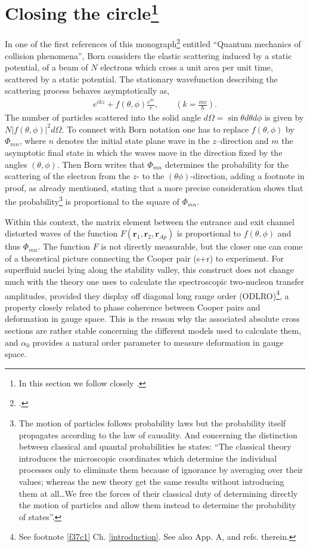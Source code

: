\section[Closing the circle]{Closing the circle\footnote{In this section we follow closely \cite{Pais:86}.}}\label{S7.6.4}
In one of the first references of this monograph\footnote{\cite{Born:26}.} entitled ``Quantum mechanics of collision phenomena'', Born considers the elastic scattering induced by a static potential, of a beam of $N$ electrons which cross a unit area per unit time, scattered by a static potential. The stationary wavefunction describing the scattering process behaves asymptotically as,
\begin{align}\label{eq7.4.2}
e^{ikz}+f(\theta,\phi)\frac{e^{kr}}{r},\quad\quad \left(k=\frac{mv}{\hbar}\right).
\end{align}
The number of particles scattered into the solid angle $d\Omega=\sin\theta d\theta d\phi$ is given by $N|f(\theta,\phi)|^2d\Omega$. To connect with Born notation one has to replace $f(\theta,\phi)$ by $\Phi_{mn}$, where $n$ denotes the initial state plane wave in the $z$--direction and $m$ the asymptotic final state in which the waves move in the direction fixed by the angles $(\theta,\phi)$. Then Born writes that $\Phi_{mn}$ determines the probability for the scattering of the electron from the $z$- to the $(\theta\phi)$-direction, adding a footnote in proof, as already mentioned, stating that a more precise consideration shows that the probability\footnote{The motion of particles follows probability laws but the probability itself propagates according to the law of causality. And concerning the distinction between classical and quantal probabilities he states: ``The classical theory introduces the microscopic coordinates which determine the individual processes only to eliminate them because of ignorance by averaging over their values; whereas the new theory get the same results without introducing them at all\dots We free the forces of their classical duty of determining directly the motion of particles and allow them instead to determine the probability of states''.} is proportional to the square of $\Phi_{mn}$. 

Within this context, the matrix element between the entrance and exit channel distorted waves of the function $F(\mathbf r_1,\mathbf r_2,\mathbf r_{Ap})$ is proportional to $f(\theta,\phi)$ and thus $\Phi_{mn}$. The function $F$ is not directly measurable, but the closer one can come of a theoretical picture connecting the Cooper pair (s+r) to experiment. For superfluid nuclei lying along the stability valley, this construct does not change much with the theory one uses to calculate the spectroscopic two-nucleon transfer amplitudes,  provided they display off diagonal long range order (ODLRO)\footnote{See footnote \ref{f37c1} Ch. \ref{introduction}. See also App. A, \cite{Potel:17} and refs. therein.}, a property closely related to phase coherence between Cooper pairs and deformation in gauge space. This is the reason why the associated absolute cross sections are rather stable concerning the different models used to calculate them, and $\alpha_0$ provides a natural order parameter to measure deformation in gauge space.


